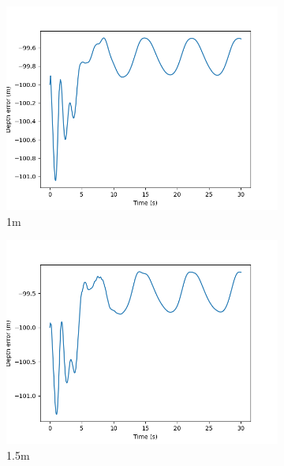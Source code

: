 \documentclass[class=article, crop=false]{standalone}
\begin{document}
\begin{figure}
\begin{subfigure}[b]{0.48\textwidth}
        \label{}
    \end{subfigure}
    \vfill
    \begin{subfigure}[b]{0.48\textwidth}
        \centering
        \includegraphics{scenario1/rov-0m/1.0m/rov_depth_error_uncontrolled}
        \caption{1m}
        \label{}
    \end{subfigure}
    \hfill
    \begin{subfigure}[b]{0.48\textwidth}
        \centering
        \includegraphics{scenario1/rov-0m/1.5m/rov_depth_error_uncontrolled}
        \caption{1.5m}
        \label{}
    \end{subfigure}
    \vfill
    \begin{subfigure}[b]{0.48\textwidth}

\end{subfigure}
\end{figure}
\end{document}
